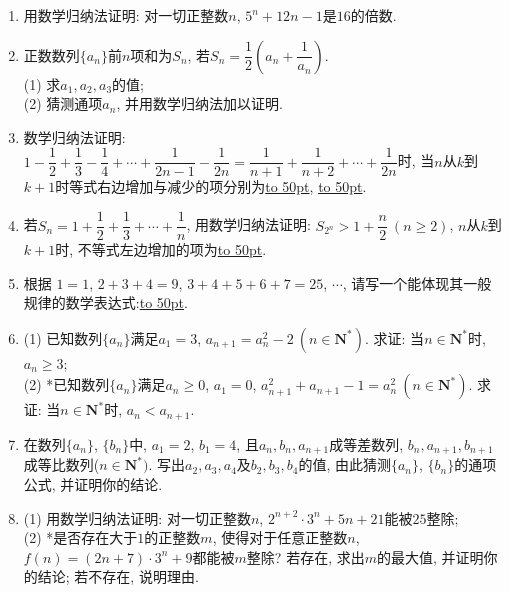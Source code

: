 \documentclass[10pt,a4paper]{article}
\newcommand{\blank}[1]{\underline{\hbox to #1pt{}}}
\begin{document}
\begin{enumerate}[1.]
\item 用数学归纳法证明: 对一切正整数$n$, $5^n+12n-1$是$16$的倍数.
\item 正数数列$\{a_n\}$前$n$项和为$S_n$, 若$S_n=\dfrac 12(a_n+\dfrac 1{a_n})$.\\
(1) 求$a_1,a_2,a_3$的值;\\
(2) 猜测通项$a_n$, 并用数学归纳法加以证明.
\item 数学归纳法证明: $1-\dfrac 12+\dfrac 13-\dfrac 14+\cdots +\dfrac 1{2n-1}-\dfrac 1{2n}=\dfrac 1{n+1}+\dfrac 1{n+2}+\cdots +\dfrac 1{2n}$时, 当$n$从$k$到$k+1$时等式右边增加与减少的项分别为\blank{50}, \blank{50}.
\item 若$S_n=1+\dfrac 12+\dfrac 13+\cdots +\dfrac 1n$, 用数学归纳法证明: $S_{2^n}>1+\dfrac n2\ (n\ge 2)$, $n$从$k$到$k+1$时, 不等式左边增加的项为\blank{50}.
\item 根据 $1=1$, $2+3+4=9$, $3+4+5+6+7=25$, $\cdots$, 请写一个能体现其一般规律的数学表达式:\blank{50}.
\item (1) 已知数列$\{a_n\}$满足$a_1=3$, $a_{n+1}=a_n^2-2\ (n\in \mathbf{N}^*)$. 求证: 当$n\in \mathbf{N}^*$时, $a_n\ge 3$;\\
(2) *已知数列$\{a_n\}$满足$a_n\ge 0$, $a_1=0$, $a_{n+1}^2+a_{n+1}-1=a_n^2 \ (n\in \mathbf{N}^*)$. 求证: 当$n\in \mathbf{N}^*$时, $a_n<a_{n+1}$.
\item 在数列$\{a_n\}$, $\{b_n\}$中, $a_1=2$, $b_1=4$, 且$a_n,b_n,a_{n+1}$成等差数列, $b_n,a_{n+1},b_{n+1}$成等比数列($n\in \mathbf{N}^*)$. 写出$a_2,a_3,a_4$及$b_2,b_3,b_4$的值, 由此猜测$\{a_n\}$, $\{b_n\}$的通项公式, 并证明你的结论.
\item (1) 用数学归纳法证明: 对一切正整数$n$, $2^{n+2}\cdot 3^n+5n+21$能被$25$整除;\\
(2) *是否存在大于$1$的正整数$m$, 使得对于任意正整数$n$, $f(n)=(2n+7)\cdot 3^n+9$都能被$m$整除? 若存在, 求出$m$的最大值, 并证明你的结论; 若不存在, 说明理由.

\end{enumerate}
\end{document}
